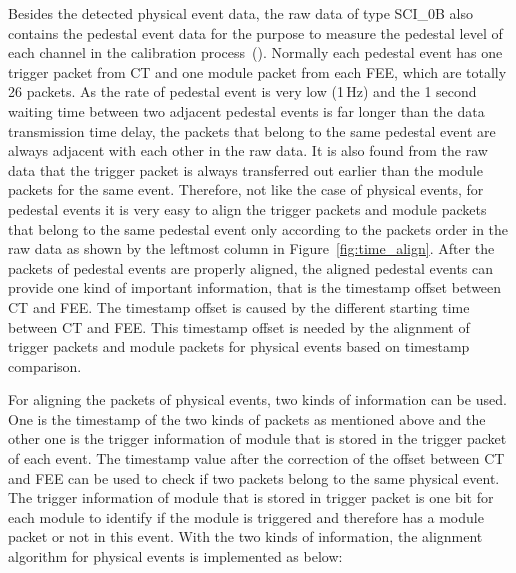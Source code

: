 \documentclass{raa}
\begin{document}
Besides the detected physical event data, the raw data of type SCI\_0B also contains the pedestal event data for the purpose to measure the pedestal level of each channel in the calibration process~(\citealt{LI20188}). Normally each pedestal event has one trigger packet from CT and one module packet from each FEE, which are totally 26 packets. As the rate of pedestal event is very low (1\,Hz) and the 1 second waiting time between two adjacent pedestal events is far longer than the data transmission time delay, the packets that belong to the same pedestal event are always adjacent with each other in the raw data. It is also found from the raw data that the trigger packet is always transferred out earlier than the module packets for the same event. Therefore, not like the case of physical events, for pedestal events it is very easy to align the trigger packets and module packets that belong to the same pedestal event only according to the packets order in the raw data as shown by the leftmost column in Figure~\ref{fig:time_align}. After the packets of pedestal events are properly aligned, the aligned pedestal events can provide one kind of important information, that is the timestamp offset between CT and FEE. The timestamp offset is caused by the different starting time between CT and FEE. This timestamp offset is needed by the alignment of trigger packets and module packets for physical events based on timestamp comparison.

For aligning the packets of physical events, two kinds of information can be used. One is the timestamp of the two kinds of packets as mentioned above and the other one is the trigger information of module that is stored in the trigger packet of each event. The timestamp value after the correction of the offset between CT and FEE can be used to check if two packets belong to the same physical event. The trigger information of module that is stored in trigger packet is one bit for each module to identify if the module is triggered and therefore has a module packet or not in this event. With the two kinds of information, the alignment algorithm for physical events is implemented as below:
\end{document}
